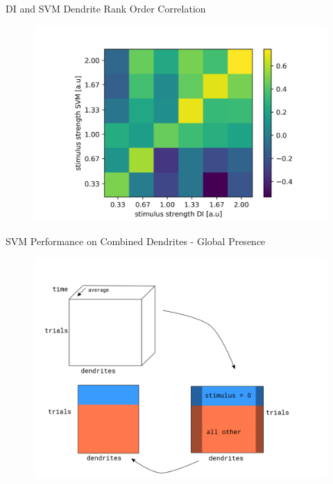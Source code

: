 \documentclass[10pt]{beamer}
\begin{document}
\begin{frame}[fragile]{DI and SVM Dendrite Rank Order Correlation}
\begin{center}
	\begin{figure}
      \includegraphics[width=1.0\textwidth]{rank_DI_SVM.png}
	\end{figure}
	\end{center}
\end{frame}

\begin{frame}[fragile]{SVM Performance on Combined Dendrites - Global Presence}
\begin{center}
	\begin{figure}
      \includegraphics[width=1.0\textwidth]{data_p_tot.png}
	\end{figure}
	\end{center}
\end{frame}
\end{document}
